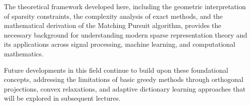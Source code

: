 \documentclass[12pt]{article}
\begin{document}
The theoretical framework developed here, including the geometric interpretation of sparsity constraints, the complexity analysis of exact methods, and the mathematical derivation of the Matching Pursuit algorithm, provides the necessary background for understanding modern sparse representation theory and its applications across signal processing, machine learning, and computational mathematics.

Future developments in this field continue to build upon these foundational concepts, addressing the limitations of basic greedy methods through orthogonal projections, convex relaxations, and adaptive dictionary learning approaches that will be explored in subsequent lectures.
\end{document}
